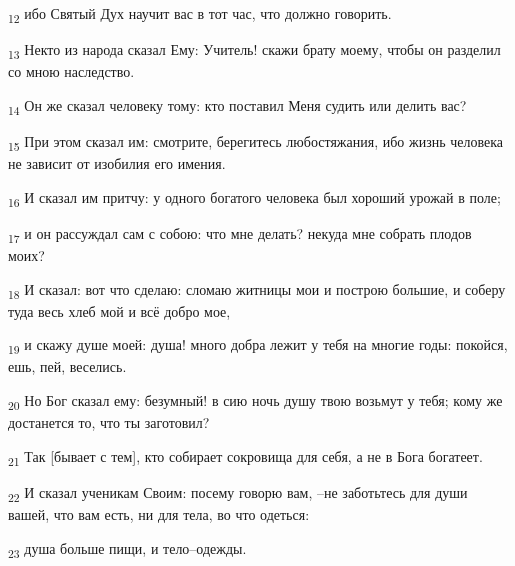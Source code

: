 \begin{tcolorbox}
\textsubscript{12} ибо Святый Дух научит вас в тот час, что должно говорить.
\end{tcolorbox}
\begin{tcolorbox}
\textsubscript{13} Некто из народа сказал Ему: Учитель! скажи брату моему, чтобы он разделил со мною наследство.
\end{tcolorbox}
\begin{tcolorbox}
\textsubscript{14} Он же сказал человеку тому: кто поставил Меня судить или делить вас?
\end{tcolorbox}
\begin{tcolorbox}
\textsubscript{15} При этом сказал им: смотрите, берегитесь любостяжания, ибо жизнь человека не зависит от изобилия его имения.
\end{tcolorbox}
\begin{tcolorbox}
\textsubscript{16} И сказал им притчу: у одного богатого человека был хороший урожай в поле;
\end{tcolorbox}
\begin{tcolorbox}
\textsubscript{17} и он рассуждал сам с собою: что мне делать? некуда мне собрать плодов моих?
\end{tcolorbox}
\begin{tcolorbox}
\textsubscript{18} И сказал: вот что сделаю: сломаю житницы мои и построю большие, и соберу туда весь хлеб мой и всё добро мое,
\end{tcolorbox}
\begin{tcolorbox}
\textsubscript{19} и скажу душе моей: душа! много добра лежит у тебя на многие годы: покойся, ешь, пей, веселись.
\end{tcolorbox}
\begin{tcolorbox}
\textsubscript{20} Но Бог сказал ему: безумный! в сию ночь душу твою возьмут у тебя; кому же достанется то, что ты заготовил?
\end{tcolorbox}
\begin{tcolorbox}
\textsubscript{21} Так [бывает с тем], кто собирает сокровища для себя, а не в Бога богатеет.
\end{tcolorbox}
\begin{tcolorbox}
\textsubscript{22} И сказал ученикам Своим: посему говорю вам, --не заботьтесь для души вашей, что вам есть, ни для тела, во что одеться:
\end{tcolorbox}
\begin{tcolorbox}
\textsubscript{23} душа больше пищи, и тело--одежды.
\end{tcolorbox}
